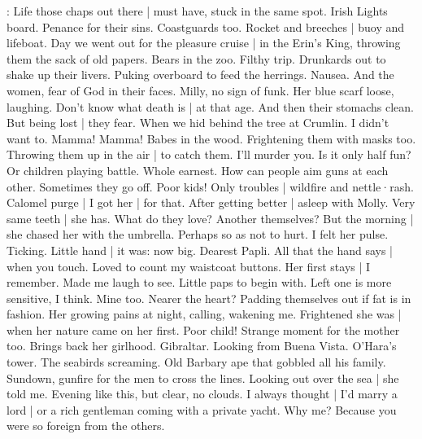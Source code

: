 \Bloom:
Life those chaps out there |
must have,
stuck in the same spot.
Irish Lights board.
Penance for their sins.
Coastguards too.
Rocket and breeches |
buoy and lifeboat.
Day we went out for the pleasure cruise |
in the Erin's King,
throwing them the sack of old papers.
Bears in the zoo.
Filthy trip.
Drunkards out to shake up their livers.
Puking overboard to feed the herrings.
Nausea.
And the women,
fear of God in their faces.
Milly,
no sign of funk.
Her blue scarf loose,
laughing.
Don't know what death is |
at that age.
And then their stomachs clean.
But being lost |
they fear.
When we hid behind the tree at Crumlin.%
I didn't want to.
Mamma!
Mamma!
Babes in the wood.
Frightening them with masks too.
Throwing them up in the air |
to catch them.
I'll murder you.
Is it only half fun?
Or children playing battle.
Whole earnest.
How can people aim guns at each other.
Sometimes they go off.
Poor kids!
Only troubles |
wildfire and nettle·rash.
Calomel purge |
I got her |
for that.
After getting better |
asleep with Molly.
Very same teeth |
she has.
What do they love?
Another themselves?
But the morning |
she chased her with the umbrella.
Perhaps so as not to hurt.
I felt her pulse.
Ticking.
Little hand |
it was:
now big.
Dearest Papli.
All that the hand says |
when you touch.
Loved to count my waistcoat buttons.
Her first stays |
I remember.
Made me laugh to see.
Little paps to begin with.%
Left one is more sensitive,
I think.
Mine too.
Nearer the heart?
Padding themselves out
if fat is in fashion.
Her growing pains at night,
calling,
wakening me.
Frightened she was |
when her nature came on her first.
Poor child!
Strange moment for the mother too.
Brings back her girlhood.
Gibraltar.
Looking from Buena Vista.
O'Hara's tower.
The seabirds screaming.
Old Barbary ape that gobbled all his family.
Sundown,
gunfire for the men to cross the lines.
Looking out over the sea |
she told me.
Evening like this,
but clear,
no clouds.
I always thought |
I'd marry a lord |
or a rich gentleman coming with a private yacht.
Why me?
Because you were so foreign
from the others.

